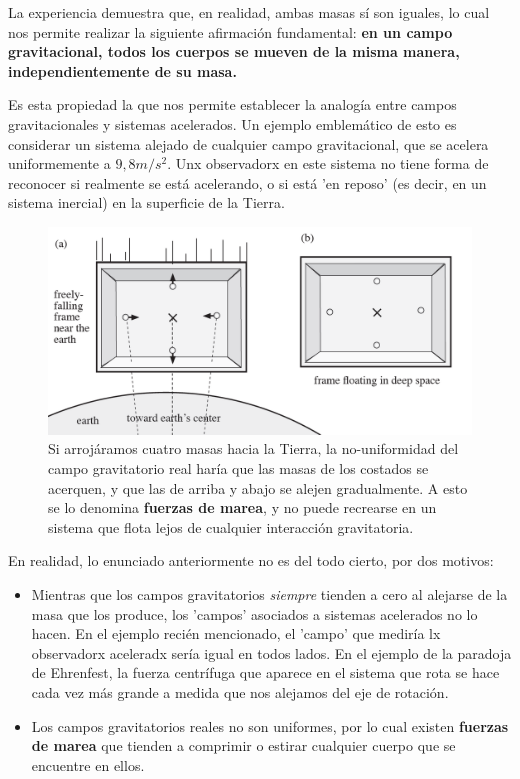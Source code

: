 La experiencia demuestra que, en realidad, ambas masas sí son iguales, lo cual nos permite realizar la siguiente afirmación fundamental: \textbf{en un campo gravitacional, todos los cuerpos se mueven de la misma manera, independientemente de su masa.}

Es esta propiedad la que nos permite establecer la analogía entre campos gravitacionales y sistemas acelerados. Un ejemplo emblemático de esto es considerar un sistema alejado de cualquier campo gravitacional, que se acelera uniformemente a $9,8 m/s^2$. Unx observadorx en este sistema no tiene forma de reconocer si realmente se está acelerando, o si está 'en reposo' (es decir, en un sistema inercial) en la superficie de la Tierra.

\begin{figure}[h!]
\includegraphics[width=\textwidth]{Im/tidal.png}
\caption{Si arrojáramos cuatro masas hacia la Tierra, la no-uniformidad del campo gravitatorio real haría que las masas de los costados se acerquen, y que las de arriba y abajo se alejen gradualmente. A esto se lo denomina \textbf{fuerzas de marea}, y no puede recrearse en un sistema que flota lejos de cualquier interacción gravitatoria.}
\label{fig:my_label}
\end{figure}

En realidad, lo enunciado anteriormente no es del todo cierto, por dos motivos:
\begin{itemize}
    \item Mientras que los campos gravitatorios \textit{siempre} tienden a cero al alejarse de la masa que los produce, los 'campos' asociados a sistemas acelerados no lo hacen. En el ejemplo recién mencionado, el 'campo' que mediría lx observadorx aceleradx sería igual en todos lados. En el ejemplo de la paradoja de Ehrenfest, la fuerza centrífuga que aparece en el sistema que rota se hace cada vez más grande a medida que nos alejamos del eje de rotación. 
    \item Los campos gravitatorios reales no son uniformes, por lo cual existen \textbf{fuerzas de marea} que tienden a comprimir o estirar cualquier cuerpo que se encuentre en ellos.
\end{itemize}

